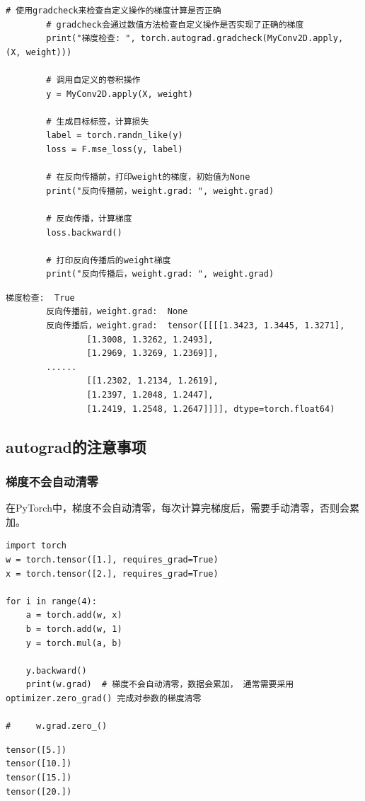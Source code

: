 \begin{example}
\begin{lstlisting}[style=pythonstyle]
        # 使用gradcheck来检查自定义操作的梯度计算是否正确
        # gradcheck会通过数值方法检查自定义操作是否实现了正确的梯度
        print("梯度检查: ", torch.autograd.gradcheck(MyConv2D.apply, (X, weight)))

        # 调用自定义的卷积操作
        y = MyConv2D.apply(X, weight)

        # 生成目标标签，计算损失
        label = torch.randn_like(y)
        loss = F.mse_loss(y, label)

        # 在反向传播前，打印weight的梯度，初始值为None
        print("反向传播前，weight.grad: ", weight.grad)

        # 反向传播，计算梯度
        loss.backward()

        # 打印反向传播后的weight梯度
        print("反向传播后，weight.grad: ", weight.grad)
        \end{lstlisting}
        \begin{lstlisting}[style=demostyle, numbers=none]
        梯度检查:  True
        反向传播前，weight.grad:  None
        反向传播后，weight.grad:  tensor([[[[1.3423, 1.3445, 1.3271],
                [1.3008, 1.3262, 1.2493],
                [1.2969, 1.3269, 1.2369]],
        ......
                [[1.2302, 1.2134, 1.2619],
                [1.2397, 1.2048, 1.2447],
                [1.2419, 1.2548, 1.2647]]]], dtype=torch.float64)        
        \end{lstlisting}
\end{example}


\subsection{autograd的注意事项}
\label{subsec:Pytorch的autograd的注意事项}
\subsubsection{梯度不会自动清零}
\label{subsubsec:Pytorch的梯度不会自动清零}
在PyTorch中，梯度不会自动清零，每次计算完梯度后，需要手动清零，否则会累加。

\begin{lstlisting}[style=pythonstyle]
import torch
w = torch.tensor([1.], requires_grad=True)
x = torch.tensor([2.], requires_grad=True)

for i in range(4):
    a = torch.add(w, x)
    b = torch.add(w, 1)
    y = torch.mul(a, b)

    y.backward()   
    print(w.grad)  # 梯度不会自动清零，数据会累加， 通常需要采用 optimizer.zero_grad() 完成对参数的梯度清零

#     w.grad.zero_()
\end{lstlisting}
\begin{lstlisting}[style=demostyle, numbers=none]
tensor([5.])
tensor([10.])
tensor([15.])
tensor([20.])
\end{lstlisting}

